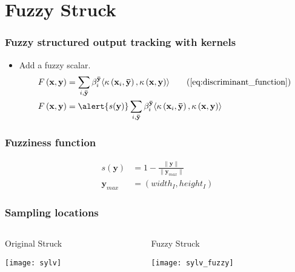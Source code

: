 \section{Fuzzy Struck}

\begin{frame}
    \frametitle{Fuzzy structured output tracking with kernels}
    \begin{itemize}
        \item Add a fuzzy scalar.
            \begin{align}
                F\left(\mathbf{x}, \mathbf{y}\right) &= \sum_{i, \mathbf{\bar{y}}} \beta_i^\mathbf{\bar{y}}
                    \langle \kappa\left(\mathbf{x}_i, \mathbf{\bar{y}}\right),
                    \kappa\left(\mathbf{x}, \mathbf{y}\right) \rangle
                    \tag{\ref{eq:discriminant_function}} \\
                F\left(\mathbf{x}, \mathbf{y}\right) &= \alert{s(\mathbf{y})} \sum_{i, \mathbf{\bar{y}}} \beta_i^\mathbf{\bar{y}}
                    \langle \kappa\left(\mathbf{x}_i, \mathbf{\bar{y}}\right),
                    \kappa\left(\mathbf{x}, \mathbf{y}\right) \rangle
            \end{align}
    \end{itemize}
\end{frame}

\begin{frame}
    \frametitle{Fuzziness function}
    \begin{align}
        s(\mathbf{y}) &= 1 - \frac{\|\mathbf{y}\|}{\|\mathbf{y}_{max}\|} \\
        \mathbf{y}_{max} &= (width_I, height_I)
    \end{align}
\end{frame}

\begin{frame}
    \frametitle{Sampling locations}
    \begin{columns}
        \begin{column}{0.5\textwidth}
            Original Struck

            \texttt{[image: sylv]}
        \end{column}
        \begin{column}{0.5\textwidth}
            Fuzzy Struck

            \texttt{[image: sylv\_fuzzy]}
        \end{column}
    \end{columns}
\end{frame}

